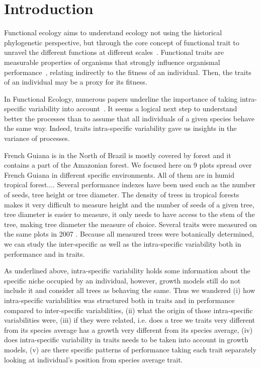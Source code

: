 \label{sec:Intro}
\section*{Introduction}
Functional ecology aims to understand ecology not using the historical phylogenetic perspective, but through the core concept of functional trait to unravel the different functions at different scales~\citep{mcgill_rebuilding_2006}. Functional traits are measurable properties of organisms that strongly influence organismal performance~\citep{mcgill_rebuilding_2006}, relating indirectly to the fitness of an individual. Then, the traits of an individual may be a proxy for its fitness.

In Functional Ecology, numerous papers underline the importance of taking intra-specific variability into account~\cite{NEEDED}. It seems a logical next step to understand better the processes than to assume that all individuals of a given species behave the same way. Indeed, traits intra-specific variability gave us insights in the variance of processes.

French Guiana is in the North of Brazil is mostly covered by forest and it contains a part of the Amazonian forest. We focused here on 9 plots spread over French Guiana in different specific environments. All of them are in humid tropical forest.... Several performance indexes have been used such as the number of seeds, tree height or tree diameter. The density of trees in tropical forests makes it very difficult to measure height and the number of seeds of a given tree, tree diameter is easier to measure, it only needs to have access to the stem of the tree, making tree diameter the measure of choice. Several traits were measured on the same plots in 2007 \citep{baraloto_decoupled_2010}. Because all measured trees were botanically determined, we can study the inter-specific as well as the intra-specific variability both in performance and in traits.

As underlined above, intra-specific variability holds some information about the specific niche occupied by an individual, however, growth models still do not include it and consider all trees as behaving the same. Thus we wandered (i) how intra-specific variabilities was structured both in traits and in performance compared to inter-specific variabilities, (ii) what the origin of those intra-specific variabilities were, (iii) if they were related, i.e. does a tree we traits very different from its species average has a growth very different from its species average, (iv) does intra-specific variability in traits needs to be taken into account in growth models, (v) are there specific patterns of performance taking each trait separately looking at individual's position from species average trait.